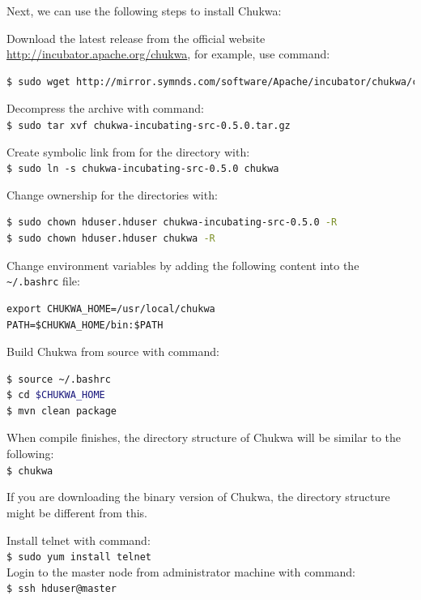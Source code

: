 Next, we can use the following steps to install Chukwa:

Download the latest release from the official website \url{http://incubator.apache.org/chukwa}, for example, use command:
\lstset{style=bashstyle}
\begin{lstlisting}[language=bash]
$ sudo wget http://mirror.symnds.com/software/Apache/incubator/chukwa/chukwa-0.5.0/chukwa-incubating-src-0.5.0.tar.gz -P /usr/local
\end{lstlisting}

Decompress the archive with command: \\
\verb|$ sudo tar xvf chukwa-incubating-src-0.5.0.tar.gz|

Create symbolic link from for the directory with: \\
\verb|$ sudo ln -s chukwa-incubating-src-0.5.0 chukwa|

Change ownership for the directories with: 
\lstset{style=bashstyle}
\begin{lstlisting}[language=bash]
$ sudo chown hduser.hduser chukwa-incubating-src-0.5.0 -R
$ sudo chown hduser.hduser chukwa -R
\end{lstlisting}

Change environment variables by adding the following content into the \verb|~/.bashrc| file: 
\lstset{style=bashstyle}
\begin{lstlisting}
export CHUKWA_HOME=/usr/local/chukwa
PATH=$CHUKWA_HOME/bin:$PATH
\end{lstlisting}

Build Chukwa from source with command: 
\lstset{style=bashstyle}
\begin{lstlisting}[language=bash]
$ source ~/.bashrc
$ cd $CHUKWA_HOME
$ mvn clean package
\end{lstlisting}

When compile finishes, the directory structure of Chukwa will be similar to the following:\\
\verb|$ chukwa|


If you are downloading the binary version of Chukwa, the directory structure might be different from this.

Install telnet with command: \\
\verb|$ sudo yum install telnet| \\

Login to the master node from administrator machine with command: \\
\verb|$ ssh hduser@master|

